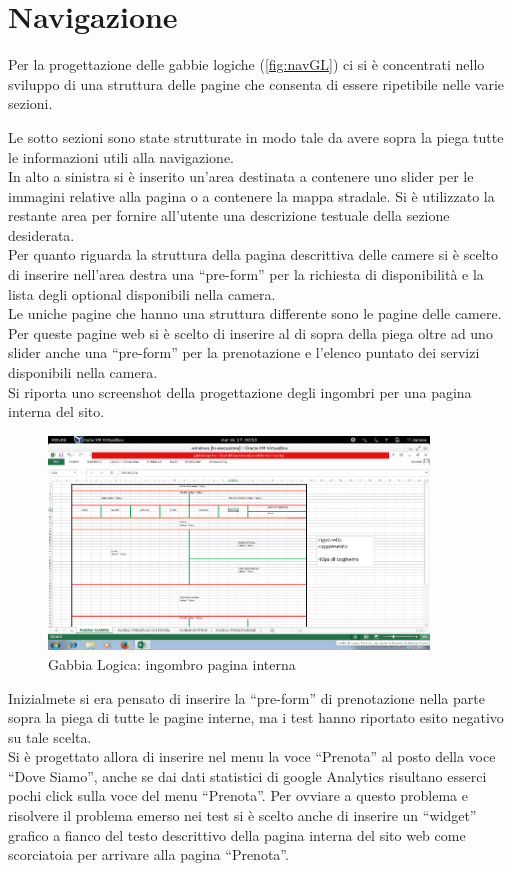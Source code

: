 \documentclass[a4paper,12pt,hidelinks]{report}
\begin{document}
\section*{Navigazione}
Per la progettazione delle gabbie logiche (\autoref{fig:navGL}) ci si è concentrati nello sviluppo di una struttura delle pagine che consenta di essere ripetibile nelle varie sezioni.
\par Le sotto sezioni sono state strutturate in modo tale da avere sopra la piega tutte le informazioni utili alla navigazione. 
\\In alto a sinistra si è inserito un'area destinata a contenere uno slider per le immagini relative alla pagina o a contenere la mappa stradale.
Si è utilizzato la restante area per fornire all'utente una descrizione testuale della sezione desiderata. 
\\Per quanto riguarda la struttura della pagina descrittiva delle camere si è scelto di inserire nell'area destra una ``pre-form'' per la richiesta di disponibilità 
e la lista degli optional disponibili nella camera.
\\Le uniche pagine che hanno una struttura differente sono le pagine delle camere. Per queste pagine web si è scelto di inserire al di sopra della piega oltre ad uno slider anche una
``pre-form'' per la prenotazione e l'elenco puntato dei servizi disponibili nella camera.
\\Si riporta uno screenshot della progettazione degli ingombri per una pagina interna del sito.
\begin{figure}[h!]%
    \includegraphics[width=0.9\textwidth,keepaspectratio=true]{../../img/navGabbieLogiche}
    \centering
    \caption{Gabbia Logica: ingombro pagina interna}%
    \label{fig:navGL}%
\end{figure}
\newline 
Inizialmete si era pensato di inserire la ``pre-form'' di prenotazione nella parte sopra la piega di tutte le pagine interne, ma i test hanno riportato esito negativo su tale scelta.
\\Si è progettato allora di inserire nel menu la voce ``Prenota'' al posto della voce ``Dove Siamo'', anche se dai dati statistici di google Analytics risultano esserci pochi click sulla voce del
menu ``Prenota''. Per ovviare a questo problema e risolvere il problema emerso nei test si è scelto anche di inserire un ``widget'' grafico a fianco del testo descrittivo della pagina interna del 
sito web come scorciatoia per arrivare alla pagina ``Prenota''.
\end{document}
